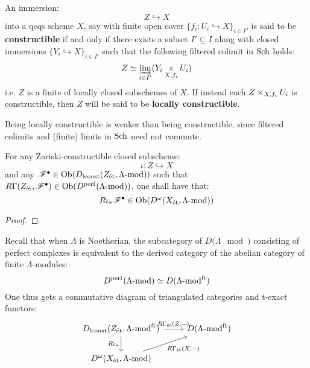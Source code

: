             \begin{definition} \label{def: constructible_subschemes}
                An immersion:
                    $$Z \hookrightarrow X$$
                into a qcqs scheme $X$, say with finite open cover $\{f_i: U_i \hookrightarrow X\}_{i \in I}$, is said to be \textbf{constructible} if and only if there exists a subset $I' \subseteq I$ along with closed immersions $\{Y_i \hookrightarrow X\}_{i \in I'}$ such that the following filtered colimit in $\mathrm{Sch}$ holds:
                    $$Z \cong \indlim_{i \in I'} (Y_i \x_{X, f_i} U_i)$$
                i.e. $Z$ is a finite  of locally closed subschemes of $X$. If instead each $Z \x_{X, f_i} U_i$ is constructible, then $Z$ will be said to be \textbf{locally constructible}.

                Being locally constructible is weaker than being constructible, since filtered colimits and (finite) limits in $\mathrm{Sch}$ need not commute.
            \end{definition}
            \begin{lemma} \label{lemma: constructible_etale_sheaves_with_perfect_global_Sections}
                For any Zariski-constructible closed subscheme:
                    $$\iota: Z \hookrightarrow X$$
                and any $\mathscr{F}^{\bullet} \in \mathrm{Ob}( D_{\mathrm{lconst}}(Z_{\mathrm{\acute{e}t}}, \Lambda\text{-}\mathrm{mod}) )$ such that $R\Gamma(Z_{\mathrm{\acute{e}t}}, \mathscr{F}^{\bullet}) \in \mathrm{Ob}( D^{\mathrm{perf}}(\Lambda\text{-}\mathrm{mod}) )$, one shall have that:
                    $$R\iota_*\mathscr{F}^{\bullet} \in \mathrm{Ob}( D^{\omega}(X_{\mathrm{\acute{e}t}}, \Lambda\text{-}\mathrm{mod}) )$$
            \end{lemma}
                \begin{proof}
                    
                \end{proof}
            \begin{remark}
                Recall that when $\Lambda$ is Noetherian, the subcategory of $D(\Lambda\mod)$ consisting of perfect complexes is equivalent to the derived category of the abelian category of finite $\Lambda$-modules:
                    $$D^{\mathrm{perf}}(\Lambda\text{-}\mathrm{mod}) \simeq D(\Lambda\text{-}\mathrm{mod}^{\mathrm{ft}})$$
                One thus gets a commutative diagram of triangulated categories and t-exact functors:
                    $$
                        \begin{tikzcd}
                    	{D_{\locallyconstant}(Z_{\et}, \Lambda\mod^{\ft})} & {D(\Lambda\mod^{\ft})} \\
                    	{D^{\omega}(X_{\et}, \Lambda\mod)}
                    	\arrow["{R\iota_*}"', from=1-1, to=2-1]
                    	\arrow["{R\Gamma_{\et}(Z, -)}", from=1-1, to=1-2]
                    	\arrow["{R\Gamma_{\et}(X, -)}"', from=2-1, to=1-2]
                        \end{tikzcd}
                    $$
            \end{remark}
